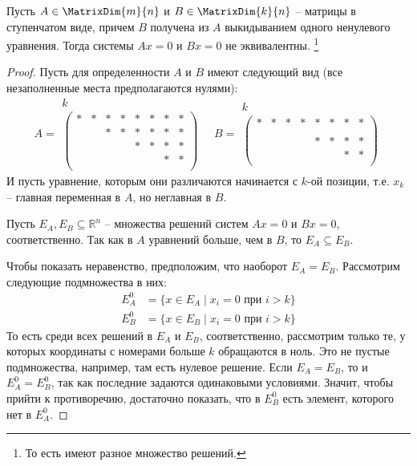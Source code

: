 \begin{claim}
Пусть $A\in\MatrixDim{m}{n}$ и $B\in\MatrixDim{k}{n}$ -- матрицы в ступенчатом виде, причем $B$ получена из $A$ выкидыванием одного ненулевого уравнения.
Тогда системы $Ax = 0$ и $Bx = 0$ не эквивалентны.%
\footnote{То есть имеют разное множество решений.}
\end{claim}
\begin{proof}
Пусть для определенности $A$ и $B$ имеют следующий вид (все незаполненные места предполагаются нулями):
\[
A = 
\begin{matrix}
{k\quad\quad\quad\quad\;}\\
\begin{pmatrix}
{*}&{*}&{*}&{*}&{*}&{*}&{*}&{*}\\
{}&{}&{*}&{*}&{*}&{*}&{*}&{*}\\
{}&{}&{}&{}&{*}&{*}&{*}&{*}\\
{}&{}&{}&{}&{}&{}&{*}&{*}\\
\end{pmatrix}
\end{matrix}
\quad
B =
\begin{matrix}
{k\quad\quad\quad\quad\;}\\
\begin{pmatrix}
{*}&{*}&{*}&{*}&{*}&{*}&{*}&{*}\\
{}&{}&{}&{}&{}&{}&{}&{}\\
{}&{}&{}&{}&{*}&{*}&{*}&{*}\\
{}&{}&{}&{}&{}&{}&{*}&{*}\\
\end{pmatrix}
\end{matrix}
\]
И пусть уравнение, которым они различаются начинается с $k$-ой позиции, т.е. $x_k$ -- главная переменная в $A$, но неглавная в $B$.

Пусть $E_A, E_B\subseteq \mathbb R^n$ -- множества решений систем $Ax = 0$ и $Bx = 0$, соответственно.
Так как в $A$ уравнений больше, чем в $B$, то $E_A \subseteq E_B$. 

Чтобы показать неравенство, предположим, что наоборот $E_A = E_B$.
Рассмотрим следующие подмножества в них:
\begin{align*}
E_A^0 &= \{x\in E_A\mid x_i = 0\text{ при }i>k\}\\
E_B^0 &= \{x\in E_B\mid x_i = 0\text{ при }i>k\}
\end{align*}
То есть среди всех решений в $E_A$ и $E_B$, соответственно, рассмотрим только те, у которых координаты с номерами больше $k$ обращаются в ноль.
Это не пустые подмножества, например, там есть нулевое решение.
Если $E_A = E_B$, то и $E_A^0 = E_B^0$, так как последние задаются одинаковыми условиями.
Значит, чтобы прийти к противоречию, достаточно показать, что в $E_B^0$ есть элемент, которого нет в $E_A^0$. 


\end{proof}
